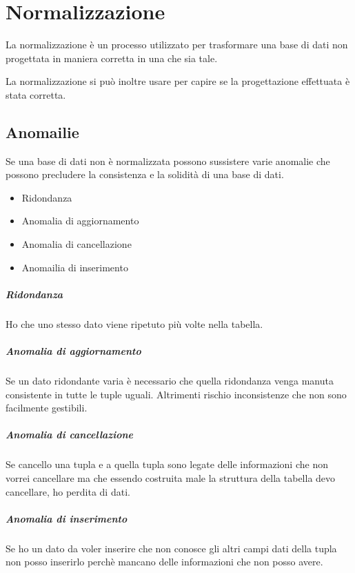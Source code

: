\chapter{Normalizzazione}

La normalizzazione è un processo utilizzato per trasformare una base di dati non progettata in maniera corretta in una che sia tale.

La normalizzazione si può inoltre usare per capire se la progettazione effettuata è stata corretta.

\section{Anomailie}

Se una base di dati non è normalizzata possono sussistere varie anomalie che possono precludere la consistenza e la solidità di una base di dati.

\begin{itemize}
    \item Ridondanza
    \item Anomalia di aggiornamento
    \item Anomalia di cancellazione
    \item Anomailia di inserimento
\end{itemize}

\paragraph{Ridondanza}
Ho che uno stesso dato viene ripetuto più volte nella tabella.

\paragraph{Anomalia di aggiornamento}
Se un dato ridondante varia è necessario che quella ridondanza venga manuta consistente in tutte le tuple uguali. Altrimenti rischio inconsistenze che non sono facilmente gestibili.

\paragraph{Anomalia di cancellazione}
Se cancello una tupla e a quella tupla sono legate delle informazioni che non vorrei cancellare ma che essendo costruita male la struttura della tabella devo cancellare, ho perdita di dati.

\paragraph{Anomalia di inserimento}
Se ho un dato da voler inserire che non conosce gli altri campi dati della tupla non posso inserirlo perchè mancano delle informazioni che non posso avere.

